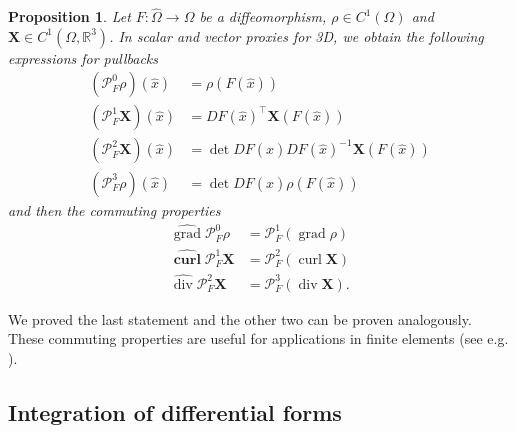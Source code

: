 \documentclass[12pt,a4paper]{article}
\numberwithin{equation}{subsection}
\numberwithin{lemma}{subsection}
\newtheorem{proposition}[lemma]{Proposition}
\theoremstyle{definition}
\DeclareMathOperator{\curl}{curl}
\DeclareMathOperator{\diver}{div}
\DeclareMathOperator{\grad}{grad}
\newcommand{\real}{\mathbb{R}}
\begin{document}
\begin{proposition}
    Let $F: \hat{\Omega} \rightarrow \Omega$ be a diffeomorphism, 
    $\rho \in C^1(\Omega)$ and $\mathbf{X} \in C^1(\Omega, \real^3)$.
    In scalar and vector proxies for 3D, we obtain the following expressions for 
    pullbacks
    \begin{align*}
        (\mathcal{P}^0_F \rho)(\hat{x}) &= \rho(F(\hat{x}))
        \\ (\mathcal{P}^1_F \mathbf{X})(\hat{x}) &= DF(\hat{x})^\top \mathbf{X}(F(\hat{x}))
        \\ (\mathcal{P}^2_F \mathbf{X})(\hat{x}) &= \det DF(\hat{x}) DF(\hat{x})^{-1} \mathbf{X}(F(\hat{x}))
        \\ (\mathcal{P}^3_F \rho)(\hat{x}) &= \det DF(\hat{x}) \rho(F(\hat{x}))
    \end{align*}
    and then the commuting properties
    \begin{align*}
        \widehat{\grad} \mathcal{P}^0_F \rho &= \mathcal{P}^1_F (\grad \rho)
        \\ \widehat{\mathbf{\curl}} \mathcal{P}^1_F \mathbf{X} &= \mathcal{P}^2_F (\curl \mathbf{X})
        \\ \widehat{\diver} \mathcal{P}^2_F \mathbf{X} &= \mathcal{P}^3_F (\diver \mathbf{X}).
    \end{align*}
\end{proposition}
We proved the last statement and the other two can be proven analogously. 
These commuting properties are useful for applications in finite elements
(see e.g. \cite[Sec.\,14.3]{ern_guermond}).





\subsection{Integration of differential forms}

\end{document}
